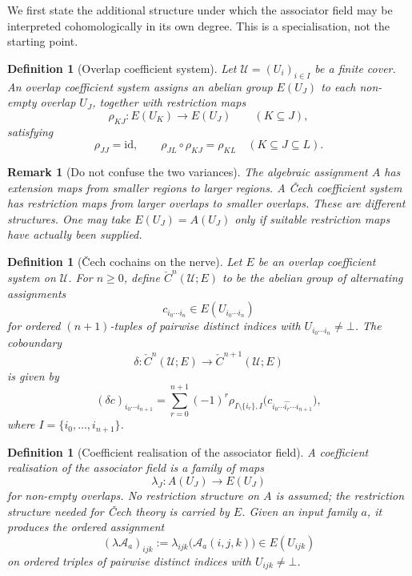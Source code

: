\documentclass[11pt]{article}
\newtheorem{definition}[theorem]{Definition}
\newtheorem{remark}[theorem]{Remark}
\newcommand{\Cech}{\check{C}}
\begin{document}
We first state the additional structure under which the associator field may be interpreted cohomologically in its own degree. This is a specialisation, not the starting point.

\begin{definition}[Overlap coefficient system]
Let \(\mathcal U=(U_i)_{i\in I}\) be a finite cover. An overlap coefficient system assigns an abelian group \(E(U_J)\) to each non-empty overlap \(U_J\), together with restriction maps
\[
\rho_{KJ}:E(U_K)\to E(U_J)
\qquad(K\subseteq J),
\]
satisfying
\[
\rho_{JJ}=\mathrm{id},
\qquad
\rho_{JL}\circ \rho_{KJ}=\rho_{KL}
\quad (K\subseteq J\subseteq L).
\]
\end{definition}

\begin{remark}[Do not confuse the two variances]
The algebraic assignment \(A\) has extension maps from smaller regions to larger regions. A \v{C}ech coefficient system has restriction maps from larger overlaps to smaller overlaps. These are different structures. One may take \(E(U_J)=A(U_J)\) only if suitable restriction maps have actually been supplied.
\end{remark}

\begin{definition}[\v{C}ech cochains on the nerve]
Let \(E\) be an overlap coefficient system on \(\mathcal U\). For \(n\geq 0\), define \(\Cech^n(\mathcal U;E)\) to be the abelian group of alternating assignments
\[
c_{i_0\cdots i_n}\in E(U_{i_0\cdots i_n})
\]
for ordered \((n+1)\)-tuples of pairwise distinct indices with \(U_{i_0\cdots i_n}\neq \bot\). The coboundary
\[
\delta:\Cech^n(\mathcal U;E)\to \Cech^{n+1}(\mathcal U;E)
\]
is given by
\[
(\delta c)_{i_0\cdots i_{n+1}}
=
\sum_{r=0}^{n+1}(-1)^r
\rho_{I\setminus\{i_r\},I}
\bigl(c_{i_0\cdots \widehat{i_r}\cdots i_{n+1}}\bigr),
\]
where \(I=\{i_0,\ldots,i_{n+1}\}\).
\end{definition}

\begin{definition}[Coefficient realisation of the associator field]
A coefficient realisation of the associator field is a family of maps
\[
\lambda_J:A(U_J)\to E(U_J)
\]
for non-empty overlaps. No restriction structure on \(A\) is assumed; the restriction structure needed for \v{C}ech theory is carried by \(E\). Given an input family \(a\), it produces the ordered assignment
\[
(\lambda\mathcal A_a)_{ijk}:=\lambda_{ijk}\bigl(\mathcal A_a(i,j,k)\bigr)
\in E(U_{ijk})
\]
on ordered triples of pairwise distinct indices with \(U_{ijk}\neq \bot\).
\end{definition}
\end{document}
